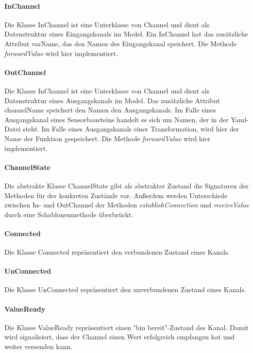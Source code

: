 \documentclass[parskip=full]{scrartcl}
\begin{document}
\paragraph{InChannel}
Die Klasse InChannel ist eine Unterklasse von Channel und dient als Datenstruktur eines Eingangskanals im Model. Ein InChannel hat das zusätzliche Attribut varName, das den Namen des Eingangskanal speichert.
Die Methode \textit{forwardValue} wird hier implementiert.
\paragraph{OutChannel}
Die Klasse InChannel ist eine Unterklasse von Channel und dient als Datenstruktur eines Ausgangskanals im Model. Das zusätzliche Attribut channelName speichert den Namen den Ausgangskanals. Im Falle eines Ausgangskanal eines Sensorbausteins handelt es sich um Namen, der in der Yaml-Datei steht. Im Falle eines Ausgangskanals einer Transformation, wird hier der Name der Funktion gespeichert.
Die Methode \textit{forwardValue} wird hier implementiert.
\paragraph{ChannelState}
Die abstrakte Klasse ChannelState gibt als abstrakter Zustand die Signaturen der Methoden für der konkreten Zustände vor. Außerdem werden Unterschiede zwischen In- und OutChannel der Methoden \textit{establishConnection} und \textit{receiveValue} durch eine Schablonenmethode  überbrückt.

\paragraph{Connected}
Die Klasse Connected repräsentiert den verbundenen Zustand eines Kanals. 
\paragraph{UnConnected}
Die Klasse UnConnected repräsentiert den unverbundenen Zustand eines Kanals. 
\paragraph{ValueReady}
Die Klasse ValueReady repräsentiert einen "bin bereit"-Zustand des Kanal. Damit wird signalisiert, dass der Channel einen Wert erfolgreich empfangen hat und weiter versenden kann.
\end{document}
